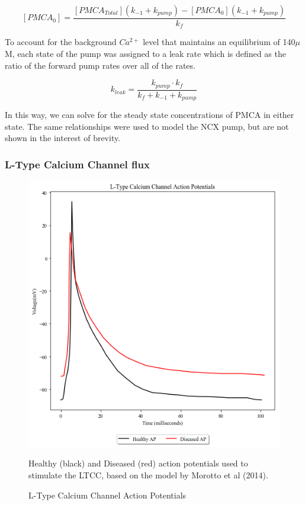 \documentclass[12pt]{ucsddissertation}
\begin{document}
\begin{equation}
\left[PMCA_{0}\right] = \frac{\left[PMCA_{Total}\right] (k_{-1} + k_{pump}) - \left[PMCA_{0}\right](k_{-1} + k_{pump})}{k_{f}}
\end{equation}

To account for the background $Ca^{2+}$ level that maintains an equilibrium of 140$\mu$M, each state of the pump was assigned to a leak rate which is defined as the ratio of the forward pump rates over all of the rates. 

\begin{equation}
k_{leak} = \frac{k_{pump} \cdot k_{f}}{k_{f}+ k_{-1}+ k_{pump}}
\end{equation}


In this way, we can solve for the steady state concentrations of PMCA in either state. The same relationships were used to model the NCX pump, but are not shown in the interest of brevity. 


\subsubsection{L-Type Calcium Channel flux}

\setcounter{figure}{1}
\begin{figure}
\centering
	\includegraphics[scale=0.5]{ap.png}
	\caption{L-Type Calcium Channel Action Potentials}Healthy (black) and Diseased (red) action potentials used to stimulate the LTCC, based on the model by Morotto et al (2014).
\end{figure}
\end{document}

